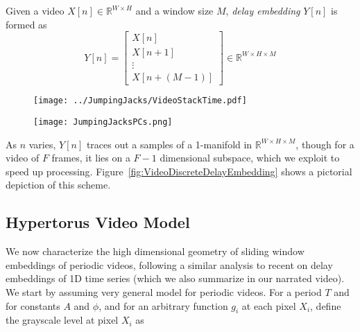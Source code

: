 \documentclass[a4paper,UKenglish]{lipics-v2016}
\begin{document}
\begin{definition}
Given a video $X[n] \in \mathbb{R}^{W \times H}$ and a window size $M$, {\em delay embedding} $Y[n]$ is formed as 
\begin{equation}
Y[n] = \left[ \begin{array}{c} X[n] \\ X[n + 1] \\ \vdots \\ X[n + (M-1)] \end{array} \right] \in \mathbb{R}^{W \times H \times M}
\end{equation}
\end{definition}

\begin{figure}
\begin{minipage}{0.4\textwidth}
	\centering
	\texttt{[image: ../JumpingJacks/VideoStackTime.pdf]}
	\label{fig:VideoDiscreteDelayEmbedding}
\end{minipage}
\begin{minipage}{0.5\textwidth}
	\centering
	\texttt{[image: JumpingJacksPCs.png]}
	\label{fig:JumpingJacksPCs}
\end{minipage}
\end{figure}

As $n$ varies, $Y[n]$ traces out a samples of a 1-manifold in $\mathbb{R}^{W \times H \times M}$, though for a video of $F$ frames, it lies on a $F-1$ dimensional subspace, which we exploit to speed up processing. Figure~\ref{fig:VideoDiscreteDelayEmbedding} shows a pictorial depiction of this scheme.

\subsection{Hypertorus Video Model}
\label{sec:VideoModel}


We now characterize the high dimensional geometry of sliding window embeddings of periodic videos, following a similar analysis to recent on delay embeddings of 1D time series \cite{perea2013sliding} (which we also summarize in our narrated video).  We start by assuming very general model for periodic videos.  For a period $T$ and for constants $A$ and $\phi$, and for an arbitrary function $g_i$ at each pixel $X_i$, define the grayscale level at pixel $X_i$ as 
\end{document}

